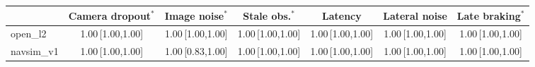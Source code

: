 \begin{tabular}{@{}lcccccc@{}}
\toprule
 & Camera dropout$^{\ast}$ & Image noise$^{\ast}$ & Stale obs.$^{\ast}$ & Latency & Lateral noise & Late braking$^{\ast}$ \\
\midrule
open\_l2 & 1.00\,{\scriptsize[1.00,1.00]} & 1.00\,{\scriptsize[1.00,1.00]} & 1.00\,{\scriptsize[1.00,1.00]} & 1.00\,{\scriptsize[1.00,1.00]} & 1.00\,{\scriptsize[1.00,1.00]} & 1.00\,{\scriptsize[1.00,1.00]} \\
navsim\_v1 & 1.00\,{\scriptsize[1.00,1.00]} & 1.00\,{\scriptsize[0.83,1.00]} & 1.00\,{\scriptsize[1.00,1.00]} & 1.00\,{\scriptsize[1.00,1.00]} & 1.00\,{\scriptsize[1.00,1.00]} & 1.00\,{\scriptsize[1.00,1.00]} \\
\bottomrule
\end{tabular}
